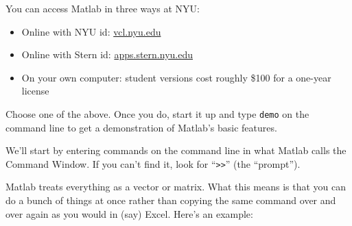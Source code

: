 \documentclass[11pt]{exam}
\begin{document}
\begin{questions}
You can access Matlab in three ways at NYU:
\begin{itemize}
\item Online with NYU id:  \url{vcl.nyu.edu}
\item Online with Stern id: \url{apps.stern.nyu.edu}
\item On your own computer:  student versions cost roughly \$100 for a one-year license
\end{itemize}

Choose one of the above.
Once you do, start it up and type
{\tt demo} on the command line to get a demonstration of Matlab's basic
features.

 We'll start by entering commands on the command line
in what Matlab calls the Command Window.
If you can't find it, look for ``{\tt >>}'' (the ``prompt'').

Matlab treats everything as a vector or matrix.
What this means is that you can do a bunch of things at once rather than copying the same command
over and over again as you would in (say) Excel.  Here's an example:
\end{questions}
\end{document}
